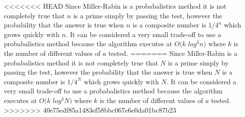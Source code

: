 <<<<<<< HEAD
Since Miller-Rabin is a probabalistics method it is not completely true that $n$ is a prime simply by passing the test, however the probability that the answer is true when $n$ is a composite number is $1 / 4^{n}$ which grows quickly with $n$. It can be considered a very small trade-off to use a probabalistics method because the algorithm executes at $O(k$ $log^3 n)$ where $k$ is the number of different values of $a$ tested. \cite{miller}
=======
Since Miller-Rabin is a probabalistics method it is not completely true that $N$ is a prime simply by passing the test, however the probability that the answer is true when $N$ is a composite number is $1 / 4^{N}$ which grows quickly with $N$. It can be considered a very small trade-off to use a probabalistics method because the algorithm executes at $O(k$ $log^3 N)$ where $k$ is the number of different values of $a$ tested. \cite{miller}
>>>>>>> 40e75edf85a1483ef58bbc067e6e0da01bc87b23
